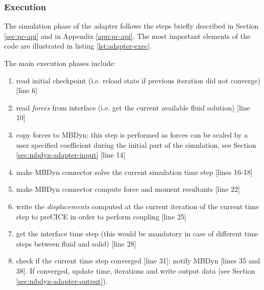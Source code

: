 \subsubsection{Execution}

The simulation phase of the adapter follows the steps briefly described in Section \ref{sec:pc-api} and in Appendix \ref{app:pc-api}. The most important elements of the code are  illustrated in listing \ref{lst:adapter-exec}.

The main execution phases include:

\begin{enumerate}
    \item read initial checkpoint (i.e. reload state if previous iteration did not converge) [line 6]
    \item read \textit{forces} from interface (i.e. get the current available fluid solution) [line 10]
    \item copy forces to MBDyn: this step is performed as forces can be scaled by a user specified coefficient during the initial part of the simulation, see Section \ref{sec:mbdyn-adapter-input} [line 14]
    \item make MBDyn connector solve the current simulation time step [lines 16-18]
    \item make MBDyn connector compute force and moment resultants [line 22]
    \item write the \textit{displacements} computed at the current iteration of the current time step to preCICE in order to perform coupling [line 25]
    \item get the interface time step (this would be mandatory in case of different time steps between fluid and solid) [line 28]
    \item check if the current time step converged [line 31]:
    notify MBDyn [lines 35 and 38]. If converged, update time, iterations and write output data (see Section \ref{sec:mbdyn-adapter-output}).
\end{enumerate}

